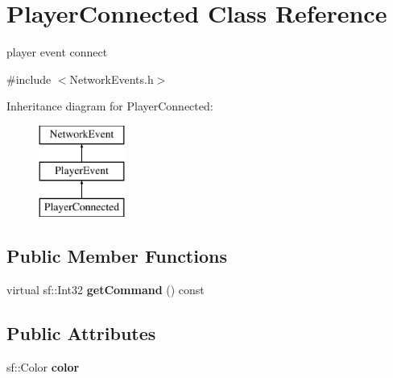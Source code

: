 \hypertarget{class_player_connected}{\section{Player\-Connected Class Reference}
\label{class_player_connected}
}


player event connect  




{\ttfamily \#include $<$Network\-Events.\-h$>$}

Inheritance diagram for Player\-Connected\-:\begin{figure}[H]
\begin{center}
\leavevmode
\includegraphics[height=3.000000cm]{class_player_connected}
\end{center}
\end{figure}
\subsection*{Public Member Functions}
\begin{DoxyCompactItemize}
\item 
\hypertarget{class_player_connected_a12e04858807192f0034059bcf2f893d1}{virtual sf\-::\-Int32 {\bfseries get\-Command} () const }\label{class_player_connected_a12e04858807192f0034059bcf2f893d1}

\end{DoxyCompactItemize}
\subsection*{Public Attributes}
\begin{DoxyCompactItemize}
\item 
\hypertarget{class_player_connected_abda0600348cd0b7218fe997bdee16083}{sf\-::\-Color {\bfseries color}}\label{class_player_connected_abda0600348cd0b7218fe997bdee16083}

\end{DoxyCompactItemize}

